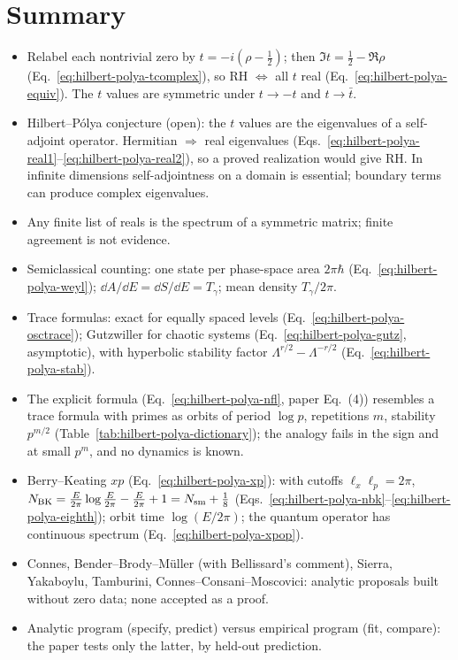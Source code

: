 \section{Summary}
\begin{itemize}
\item Relabel each nontrivial zero by $t=-i(\rho-\tfrac12)$; then $\Im t=\tfrac12-\Re\rho$ (Eq.~\eqref{eq:hilbert-polya-tcomplex}), so RH $\iff$ all $t$ real (Eq.~\eqref{eq:hilbert-polya-equiv}). The $t$ values are symmetric under $t\to-t$ and $t\to\bar t$.
\item Hilbert--P\'olya conjecture (open): the $t$ values are the eigenvalues of a self-adjoint operator. Hermitian $\Rightarrow$ real eigenvalues (Eqs.~\eqref{eq:hilbert-polya-real1}--\eqref{eq:hilbert-polya-real2}), so a proved realization would give RH. In infinite dimensions self-adjointness on a domain is essential; boundary terms can produce complex eigenvalues.
\item Any finite list of reals is the spectrum of a symmetric matrix; finite agreement is not evidence.
\item Semiclassical counting: one state per phase-space area $2\pi\hbar$ (Eq.~\eqref{eq:hilbert-polya-weyl}); $\dd A/\dd E=\dd S/\dd E=T_\gamma$; mean density $T_\gamma/2\pi$.
\item Trace formulas: exact for equally spaced levels (Eq.~\eqref{eq:hilbert-polya-osctrace}); Gutzwiller for chaotic systems (Eq.~\eqref{eq:hilbert-polya-gutz}, asymptotic), with hyperbolic stability factor $\Lambda^{r/2}-\Lambda^{-r/2}$ (Eq.~\eqref{eq:hilbert-polya-stab}).
\item The explicit formula (Eq.~\eqref{eq:hilbert-polya-nfl}, paper Eq.~(4)) resembles a trace formula with primes as orbits of period $\log p$, repetitions $m$, stability $p^{m/2}$ (Table~\ref{tab:hilbert-polya-dictionary}); the analogy fails in the sign and at small $p^m$, and no dynamics is known.
\item Berry--Keating $xp$ (Eq.~\eqref{eq:hilbert-polya-xp}): with cutoffs $\ell_x\ell_p=2\pi$, $N_{\rm BK}=\frac E{2\pi}\log\frac E{2\pi}-\frac E{2\pi}+1=N_{\mathrm{sm}}+\tfrac18$ (Eqs.~\eqref{eq:hilbert-polya-nbk}--\eqref{eq:hilbert-polya-eighth}); orbit time $\log(E/2\pi)$; the quantum operator has continuous spectrum (Eq.~\eqref{eq:hilbert-polya-xpop}).
\item Connes, Bender--Brody--M\"uller (with Bellissard's comment), Sierra, Yakaboylu, Tamburini, Connes--Consani--Moscovici: analytic proposals built without zero data; none accepted as a proof.
\item Analytic program (specify, predict) versus empirical program (fit, compare): the paper tests only the latter, by held-out prediction.
\end{itemize}

